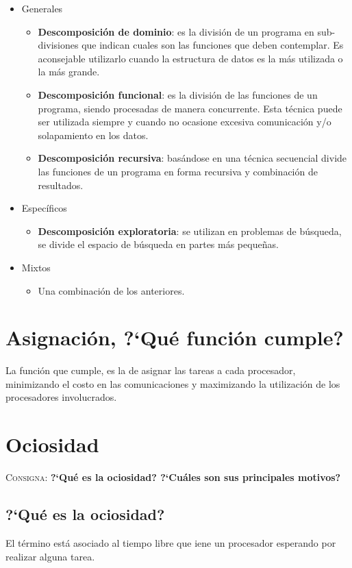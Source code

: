 \documentclass{article}
\begin{document}
\begin{itemize}
\item Generales
	\begin{itemize}
	\item \textbf{Descomposici\'on de dominio}: es la divisi\'on de un
programa en sub-divisiones que indican cuales son las funciones que deben
contemplar. Es aconsejable utilizarlo cuando la estructura de datos es la m\'as
utilizada o la m\'as grande.
	\item \textbf{Descomposici\'on funcional}: es la divisi\'on de las
funciones de un programa, siendo procesadas de manera concurrente. Esta
t\'ecnica puede ser utilizada siempre y cuando no ocasione excesiva
comunicaci\'on y/o solapamiento en los datos.
	\item \textbf{Descomposici\'on recursiva}: bas\'andose en una t\'ecnica
secuencial divide las funciones de un programa en forma recursiva y
combinaci\'on de resultados.
	\end{itemize}
\item Espec\'ificos
	\begin{itemize}
	\item \textbf{Descomposici\'on exploratoria}: se utilizan en problemas
de b\'usqueda, se divide el espacio de b\'usqueda en partes m\'as peque\~nas.
	\end{itemize}
\item Mixtos
	\begin{itemize}
	\item Una combinaci\'on de los anteriores.
	\end{itemize}
\end{itemize}

\section{Asignaci\'on, ?`Qu\'e funci\'on cumple?}
La funci\'on que cumple, es la de asignar las tareas a cada procesador,
minimizando el costo en las comunicaciones y maximizando la utilizaci\'on de los
procesadores involucrados.

\section{Ociosidad}
\textsc{Consigna}: \textbf{?`Qu\'e es la ociosidad? ?`Cu\'ales son sus principales motivos?}
\subsection{?`Qu\'e es la ociosidad?}
El t\'ermino est\'a asociado al tiempo libre que iene un procesador esperando
por realizar alguna tarea.
\end{document}
